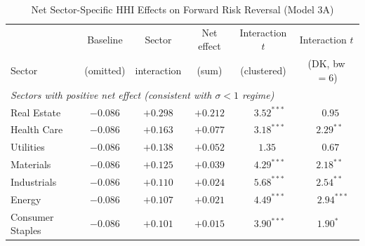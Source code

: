 
\begin{table}[!htbp]
\centering
\small
\caption{Net Sector-Specific HHI Effects on Forward Risk Reversal (Model 3A)}
\label{tab:net_sector_effects}

\begin{threeparttable}
\begin{tabular}{l c c c c c}
\toprule
 & \multicolumn{1}{c}{Baseline} 
 & \multicolumn{1}{c}{Sector}
 & \multicolumn{1}{c}{Net effect}
 & \multicolumn{1}{c}{Interaction $t$}
 & \multicolumn{1}{c}{Interaction $t$} \\
Sector
 & \multicolumn{1}{c}{(omitted)}
 & \multicolumn{1}{c}{interaction}
 & \multicolumn{1}{c}{(sum)}
 & \multicolumn{1}{c}{(clustered)}
 & \multicolumn{1}{c}{(DK, bw $=6$)} \\
\midrule
\multicolumn{6}{l}{\textit{Sectors with positive net effect (consistent with $\sigma < 1$ regime)}} \\
\addlinespace[2pt]
Real Estate            & $-0.086$ & $+0.298$ & $+0.212$ & $\phantom{-}3.52^{***}$ & $\phantom{-}0.95\phantom{^{*}}$ \\
Health Care            & $-0.086$ & $+0.163$ & $+0.077$ & $\phantom{-}3.18^{***}$ & $\phantom{-}2.29^{**\phantom{*}}$ \\
Utilities              & $-0.086$ & $+0.138$ & $+0.052$ & $\phantom{-}1.35\phantom{^{*}}$ & $\phantom{-}0.67\phantom{^{*}}$ \\
Materials              & $-0.086$ & $+0.125$ & $+0.039$ & $\phantom{-}4.29^{***}$ & $\phantom{-}2.18^{**\phantom{*}}$ \\
Industrials            & $-0.086$ & $+0.110$ & $+0.024$ & $\phantom{-}5.68^{***}$ & $\phantom{-}2.54^{**\phantom{*}}$ \\
Energy                 & $-0.086$ & $+0.107$ & $+0.021$ & $\phantom{-}4.49^{***}$ & $\phantom{-}2.94^{***}$ \\
Consumer Staples       & $-0.086$ & $+0.101$ & $+0.015$ & $\phantom{-}3.90^{***}$ & $\phantom{-}1.90^{*\phantom{**}}$ \\

\end{tabular}
\end{threeparttable}
\end{table}
